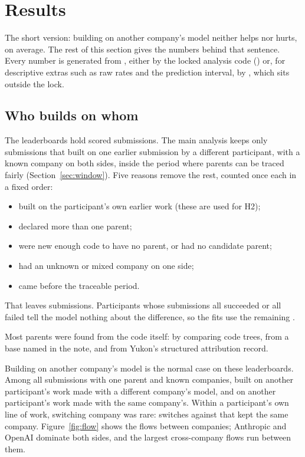 \section{Results}
\label{sec:results}

The short version: building on another company's model neither helps nor hurts, on average.
The rest of this section gives the numbers behind that sentence.
Every number is generated from , either by the locked analysis code () or, for descriptive extras such as raw rates and the prediction interval, by , which sits outside the lock.

\subsection{Who builds on whom}
\label{sec:sample}

The \StudyK{} leaderboards hold \AnalysisRowsTotal{} scored submissions.
The main analysis keeps only submissions that built on one earlier submission by a different participant, with a known company on both sides, inside the period where parents can be traced fairly (Section~\ref{sec:window}).
Five reasons remove the rest, counted once each in a fixed order:
\begin{itemize}
  \item \ExclOwnLineage{} built on the participant's own earlier work (these are used for H2);
  \item \ExclMultiParent{} declared more than one parent;
  \item \ExclNovel{} were new enough code to have no parent, or had no candidate parent;
  \item \ExclUnknownFamily{} had an unknown or mixed company on one side;
  \item \ExclOutsideWindow{} came before the traceable period.
\end{itemize}
That leaves \PrimaryRowsTotal{} submissions.
Participants whose submissions all succeeded or all failed tell the model nothing about the difference, so the fits use the remaining \FitRowsTotal{}.

Most parents were found from the code itself: \TreeShare{} by comparing code trees, \TextShare{} from a base named in the note, and \DeclaredShare{} from Yukon's structured attribution record.

Building on another company's model is the normal case on these leaderboards.
Among all submissions with one parent and known companies, \CellOtherSwitch{} built on another participant's work made with a different company's model, and \CellOtherSame{} on another participant's work made with the same company's.
Within a participant's own line of work, switching company was rare: \CellOwnSwitch{} switches against \CellOwnSame{} that kept the same company.
Figure~\ref{fig:flow} shows the flows between companies; Anthropic and OpenAI dominate both sides, and the largest cross-company flows run between them.

